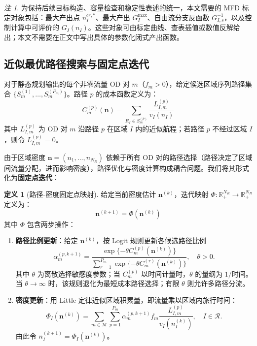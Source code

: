 \documentclass[a4paper,12pt]{article}
\theoremstyle{plain}
\theoremstyle{definition}
\newtheorem{definition}[theorem]{定义}
\theoremstyle{remark}
\newtheorem{remark}[theorem]{注}
\begin{document}
\begin{remark}
为保持后续目标构造、容量检查和稳定性表述的统一，本文需要的 MFD 标定对象包括：最大产出点 $n_I^{cr,*}$、最大产出 $G_I^{\max}$、自由流分支反函数 $G_{I,s}^{-1}$，以及控制计算中可评价的 $G_I(n_I)$。这些对象可由标定曲线、查表插值或数值反解给出；本文不需要在正文中写出具体的参数化闭式产出函数。
\end{remark}

\subsection{近似最优路径搜索与固定点迭代}

对于静态规划输出的每个非零流量 OD 对 $m$（$f_m > 0$），给定候选区域序列路径集合 $\{S_m^{(1)},\dots,S_m^{(P_m)}\}$。路径 $p$ 的成本函数定义为：
\begin{equation}\label{eq:path_cost}
    C_m^{(p)}(\bm n) = \sum_{R_I \in S_m^{(p)}} \frac{L_{I,m}^{(p)}}{v_I(n_I)}
\end{equation}
其中 $L_{I,m}^{(p)}$ 为 OD 对 $m$ 沿路径 $p$ 在区域 $I$ 内的近似航程；若路径 $p$ 不经过区域 $I$，则令 $L_{I,m}^{(p)}=0$。

由于区域密度 $\bm{n} = (n_1, \dots, n_{N_R})$ 依赖于所有 OD 对的路径选择（路径决定了区域间流量分配，进而影响密度），路径优化与密度计算构成耦合问题。我们将其形式化为\textbf{固定点迭代}：

\begin{definition}[路径-密度固定点映射]\label{def:fixed_point}
给定当前密度估计 $\bm{n}^{(k)}$，迭代映射 $\Phi: \mathbb{R}_{+}^{N_R} \to \mathbb{R}_{+}^{N_R}$ 定义为：
\begin{equation}\label{eq:fixed_point_map}
    \bm{n}^{(k+1)} = \Phi(\bm{n}^{(k)})
\end{equation}
其中 $\Phi$ 包含两步操作：
\begin{enumerate}
    \item \textbf{路径比例更新}：给定 $\bm{n}^{(k)}$，按 Logit 规则更新各候选路径比例
    \begin{equation}\label{eq:logit_update}
        \alpha_m^{(p,k+1)}
        =
        \frac{\exp\{-\theta C_m^{(p)}(\bm n^{(k)})\}}
        {\sum_{r=1}^{P_m}\exp\{-\theta C_m^{(r)}(\bm n^{(k)})\}},
        \quad \theta>0 .
    \end{equation}
    其中 $\theta$ 为离散选择敏感度参数；当 $C_m^{(p)}$ 以时间计量时，$\theta$ 的量纲为 $1/\text{时间}$。当 $\theta\to\infty$ 时，该规则退化为最短成本路径选择；有限 $\theta$ 则允许多路径分流。
    \item \textbf{密度更新}：用 Little 定律近似区域积累量，即流量乘以区域内旅行时间：
    \begin{equation}\label{eq:density_update}
        \Phi_I(\bm n^{(k)})
        =
        \sum_{m\in\mathcal M}\sum_{p=1}^{P_m}
        \alpha_m^{(p,k+1)} f_m
        \frac{L_{I,m}^{(p)}}{v_I(n_I^{(k)})},
        \quad I\in\mathcal R .
    \end{equation}
    由此令 $n_I^{(k+1)}=\Phi_I(\bm n^{(k)})$。
\end{enumerate}
\end{definition}
\end{document}
